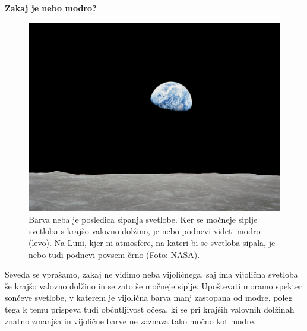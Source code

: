 \begin{example}{\bf Zakaj je nebo modro?}
\begin{figure}[!h]
\includegraphics[width=7truecm]{slike/07_Luna.jpg}
\caption{Barva neba je posledica sipanja svetlobe. Ker se močneje siplje 
svetloba s krajšo valovno dolžino, je nebo podnevi videti modro (levo).
Na Luni, kjer ni atmosfere, na kateri bi se svetloba sipala, je nebo 
tudi podnevi povsem črno (Foto: NASA).}
\label{fig:07_Modrina}
\end{figure}

Seveda se vprašamo, zakaj ne vidimo neba vijoličnega, saj 
ima vijolična svetloba še krajšo valovno dolžino in se zato še močneje siplje. Upoštevati 
moramo spekter sončeve svetlobe, v katerem je vijolična barva manj zastopana od modre, poleg
tega k temu prispeva tudi občutljivost očesa, ki se pri krajših valovnih dolžinah znatno 
zmanjša in vijolične barve ne zaznava tako močno kot modre. 
\end{example}

